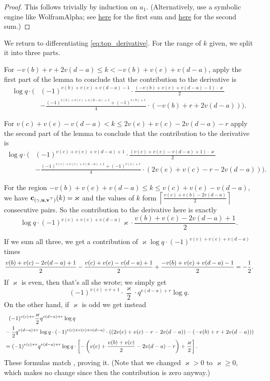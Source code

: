 \begin{proof}
  This follows trivially by induction on $a_1$.
  (Alternatively, use a symbolic engine like WolframAlpha;
  see
  \href{https://www.wolframalpha.com/input?i=sum+\%28k-a\%29*k*\%28-1\%29\%5Ek+from+k\%3Da+to+b}{here}
  for the first sum and
  \href{https://www.wolframalpha.com/input?i=sum+\%28b-k\%29*k*\%28-1\%29\%5Ek+from+k\%3Da+to+b}{here}
  for the second sum.)
\end{proof}
We return to differentiating \eqref{eq:top_derivative}.
For the range of $k$ given, we split it into three parts.
\begin{itemize}
  \ii For $-v(b) + r + 2v(d-a) \le k < -v(b) + v(e) + v(d-a)$,
  apply the first part of the lemma to conclude that the contribution to the derivative is
  \begin{align*}
    \log q \cdot \Big( & (-1)^{v(b)+v(e)+v(d-a)-1} \cdot
      \frac{(-v(b)+v(e)+v(d-a)-1) \cdot \varkappa}{2} \\
      &
      - \frac{(-1)^{v(b)+v(e)+v(d-a)+1} + (-1)^{v(b)+r}}{4} \cdot (-v(b) + r + 2v(d-a))
    \Big).
  \end{align*}

  \ii For $v(c)+v(e)-v(d-a) < k \le 2v(e)+v(c)-2v(d-a)-r$
  apply the second part of the lemma to conclude that the contribution to the derivative is
  \begin{align*}
    \log q \cdot \Big( & (-1)^{v(c)+v(e)+v(d-a)+1} \cdot
      \frac{(v(c)+v(e)-v(d-a)+1) \cdot \varkappa}{2} \\
      &
      - \frac{(-1)^{v(c)+v(e)+v(d-a)+1} + (-1)^{v(c)+r}}{4} \cdot (2v(e)+v(c)-r-2v(d-a))
    \Big).
  \end{align*}

  \ii For the region $-v(b)+v(e)+v(d-a) \le k \le v(c)+v(e)-v(d-a)$,
  we have $\mathbf c_{{(\gamma, \mathbf u, \mathbf v^\top)}}(k) = \varkappa$
  and the values of $k$ form $\left\lceil \frac{v(c)+v(b)-2v(d-a)}{2} \right\rceil$ consecutive pairs.
  So the contribution to the derivative here is exactly
  \[ \log q \cdot (-1)^{v(c)+v(e)+v(d-a)} \varkappa \cdot \frac{v(b)+v(c)-2v(d-a)+1}{2}. \]
\end{itemize}
If we sum all three,
we get a contribution of $\varkappa \log q \cdot  (-1)^{v(c)+v(e)+v(d-a)}$ times
\[ \frac{v(b)+v(c)-2v(d-a)+1}{2} - \frac{v(c)+v(e)-v(d-a)+1}{2} + \frac{-v(b)+v(e)+v(d-a)-1}{2}
  = -\frac{1}{2}. \]
If $\varkappa$ is even, then that's all she wrote; we simply get
\[ (-1)^{v(c)+r+1} \cdot \frac{\varkappa}{2} \cdot q^{v(d-a)+r} \log q. \]
On the other hand, if $\varkappa$ is odd we get instead
\begin{align*}
  &\phantom+ (-1)^{v(c)+r} \frac{\varkappa}{2} q^{v(d-a)+r} \log q \\
  &- \half q^{v(d-a)+r} \log q \cdot (-1)^{v(c)+v(e)+v(d-a)} \cdot
  \left( \left( 2v(e)+v(c)-r-2v(d-a)\right) - \left( -v(b)+r+2v(d-a) \right) \right) \\
  &= (-1)^{v(c)+r} q^{v(d-a)+r} \log q \cdot \left[
    -\left( v(e)+\frac{v(b)+v(c)}{2}-2v(d-a)-r \right) + \frac{\varkappa}{2} \right].
\end{align*}
These formulas match , proving it.
(Note that we changed $\varkappa > 0$ to $\varkappa \ge 0$,
which makes no change since then the contribution is zero anyway.)

